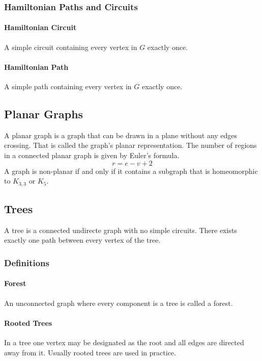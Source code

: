 \documentclass[a4paper, 10pt]{article}
\begin{document}
\subsubsection{Hamiltonian Paths and Circuits}
\paragraph{Hamiltonian Circuit}
A simple circuit containing every vertex in \(G\) exactly once.
\paragraph{Hamiltonian Path}
A simple path containing every vertex in \(G\) exactly once.

\subsection{Planar Graphs}
A planar graph is a graph that can be drawn in a plane without any edges crossing. That is called the graph's planar representation. The number of regions in a connected planar graph is given by Euler's formula.
\[ r=e-v+2 \]
A graph is non-planar if and only if it contains a subgraph that is homeomorphic to \(K_{3,3}\) or \(K_5\).

\newpage
\subsection{Trees}
A tree is a connected undirecte graph with no simple circuits. There exists exactly one path between every vertex of the tree.

\subsubsection{Definitions}
\paragraph{Forest}
An unconnected graph where every component is a tree is called a forest.
\paragraph{Rooted Trees}
In a tree one vertex may be designated as the root and all edges are directed away from it. Usually rooted trees are used in practice.
\end{document}
